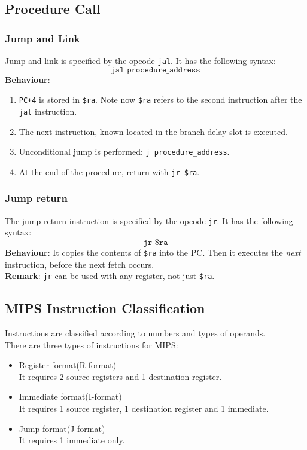 \documentclass[12pt]{article}
\theoremstyle{definition}
\begin{document}
\subsection{Procedure Call}
\subsubsection{Jump and Link}
Jump and link is specified by the opcode \texttt{jal}. It has the following syntax:
\[
\texttt{jal procedure\_address}
\]
\textbf{Behaviour}:
\begin{enumerate}
  \item \texttt{PC+4} is stored in \texttt{\$ra}. Note now \texttt{\$ra} refers to the second instruction after the \texttt{jal} instruction.
  \item The next instruction, known located in the branch delay slot is executed.
  \item Unconditional jump is performed: \texttt{j procedure\_address}.
  \item At the end of the procedure, return with \texttt{jr \$ra}.
\end{enumerate}
\subsubsection{Jump return}
The jump return instruction is specified by the opcode \texttt{jr}. It has the following syntax:
\[
\texttt{jr \$ra}
\]
\textbf{Behaviour}: It copies the contents of \texttt{\$ra} into the PC. Then it executes the \textit{next} instruction, before the next fetch occurs.\\
\textbf{Remark}: \texttt{jr} can be used with any register, not just \texttt{\$ra}.
\subsection{MIPS Instruction Classification}
Instructions are classified according to numbers and types of operands. \\There are three types of instructions for MIPS:
\begin{itemize}
  \item Register format(R-format)\\It requires 2 source registers and 1 destination register.
  \item Immediate format(I-format)\\It requires 1 source register, 1 destination register and 1 immediate.
  \item Jump format(J-format)\\It requires 1 immediate only.
\end{itemize}
\end{document}
